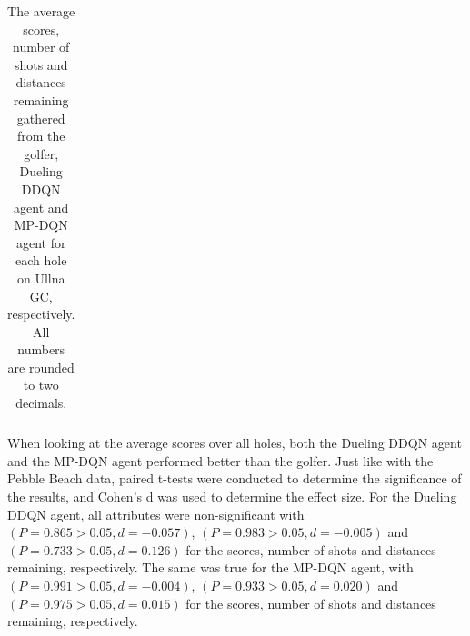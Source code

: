 \documentclass{kththesis}
\begin{document}
\begin{table}
\begin{subtable}{0.3\textwidth}
{\begin{tabular}{|c|c|c|c|c|}
    \end{tabular}
    }
    \end{subtable}
    \hfill
    \begin{subtable}{0.3\textwidth}
    \centering
    \end{subtable}
    \caption{The average scores, number of shots and distances remaining gathered from the golfer, Dueling DDQN agent and MP-DQN agent for each hole on Ullna GC, respectively. All numbers are rounded to two decimals.}
    \label{tab:ullna_average_results}
\end{table}

When looking at the average scores over all holes, both the Dueling DDQN agent and the MP-DQN agent performed better than the golfer. Just like with the Pebble Beach data, paired t-tests were conducted to determine the significance of the results, and Cohen's d was used to determine the effect size. For the Dueling DDQN agent, all attributes were non-significant with $(P = 0.865 > 0.05, d = -0.057)$, $(P = 0.983 > 0.05, d = -0.005)$ and $(P = 0.733 > 0.05, d = 0.126)$ for the scores, number of shots and distances remaining, respectively. The same was true for the MP-DQN agent, with $(P = 0.991 > 0.05, d = -0.004)$, $(P = 0.933 > 0.05, d = 0.020)$ and $(P = 0.975 > 0.05, d = 0.015)$ for the scores, number of shots and distances remaining, respectively.
\end{document}

